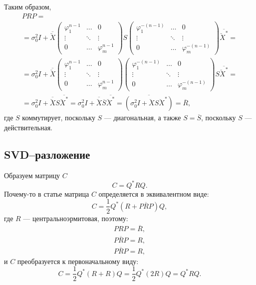 Таким образом,
\begin{multline*}
    P R P = \\
    = \sigma_0^2 I
    + \overline{\breve{X}}
    \begin{pmatrix}
        \varphi_1^{n-1} & \dots  & 0               \\
        \vdots          & \ddots & \vdots          \\
        0               & \dots  & \varphi_m^{n-1}
    \end{pmatrix}
    S
    \begin{pmatrix}
        \varphi_1^{-(n-1)} & \dots  & 0                  \\
        \vdots             & \ddots & \vdots             \\
        0                  & \dots  & \varphi_m^{-(n-1)}
    \end{pmatrix}
    \overline{\breve{X}^*} = \\
    = \sigma_0^2 I
    + \overline{\breve{X}}
    \begin{pmatrix}
        \varphi_1^{n-1} & \dots  & 0               \\
        \vdots          & \ddots & \vdots          \\
        0               & \dots  & \varphi_m^{n-1}
    \end{pmatrix}
    \begin{pmatrix}
        \varphi_1^{-(n-1)} & \dots  & 0                  \\
        \vdots             & \ddots & \vdots             \\
        0                  & \dots  & \varphi_m^{-(n-1)}
    \end{pmatrix}
    S
    \overline{\breve{X}^*} = \\
    = \sigma_0^2 I + \overline{\breve{X}} S \overline{\breve{X}^*}
    = \sigma_0^2 I + \overline{\breve{X}} \overline{S} \overline{\breve{X}^*}
    = \overline{\left( \sigma_0^2 I + \breve{X} S \breve{X}^* \right)}
    = \overline{R} ,
\end{multline*}
где $S$ коммутирует, поскольку $S$ --- диагональная, а также $S = \overline{S}$, поскольку $S$ --- действительная.

\subsection{SVD--разложение}

Образуем матрицу $C$
\[
    C
    = Q^* R Q .
\]
Почему-то в статье \cite{Cao_Liu} матрица $C$ определяется в эквивалентном виде:
\[
    C
    = \frac{1}{2} Q^* \left( R + P \overline{R} P \right) Q ,
\]
где $R$ --- центральноэрмитовая, поэтому:
\begin{gather*}
    P R P = \overline{R} , \\
    \overline{P R P} = R , \\
    P \overline{R} P = R ,
\end{gather*}
и $C$ преобразуется к первоначальному виду:
\[
    C
    = \frac{1}{2} Q^* \left( R + R \right) Q
    = \frac{1}{2} Q^* \left( 2 R \right) Q
    = Q^* R Q .
\]

